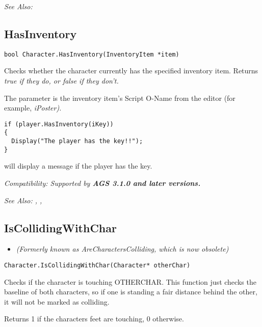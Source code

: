 \it{See Also:} 


\subsection{HasInventory}\label{Character.HasInventory}%

\begin{verbatim}
bool Character.HasInventory(InventoryItem *item)
\end{verbatim}
Checks whether the character currently has the specified inventory item.
Returns \it{true} if they do, or \it{false} if they don't.

The parameter is the inventory item's Script O-Name from the editor (for
example, \it{iPoster}).

\begin{verbatim}
if (player.HasInventory(iKey))
{
  Display("The player has the key!!");
}
\end{verbatim}
will display a message if the player has the key.

\it{Compatibility:} Supported by \bf{AGS 3.1.0} and later versions.

\it{See Also:} ,
,



\subsection{IsCollidingWithChar}\label{Character.IsCollidingWithChar}%

\begin{itemize}
\item \it{(Formerly known as AreCharactersColliding, which is now obsolete)}
\end{itemize}

\begin{verbatim}
Character.IsCollidingWithChar(Character* otherChar)
\end{verbatim}
Checks if the character is touching OTHERCHAR. This function just checks
the baseline of both characters, so if one is standing a fair distance behind
the other, it will not be marked as colliding.

Returns 1 if the characters feet are touching, 0 otherwise.

